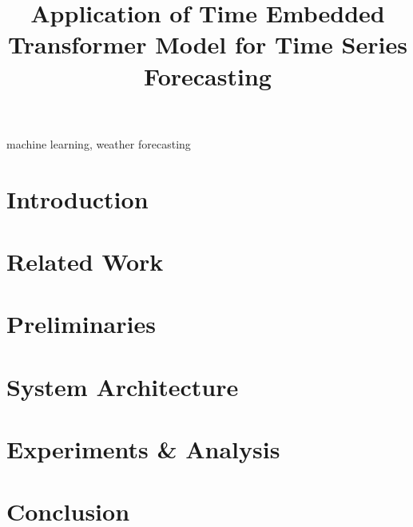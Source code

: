 





\newpage

\title{Application of Time Embedded Transformer Model for Time Series Forecasting}
\author{
    \and
    \and
    \and
}


\maketitle

\begin{abstract}

\end{abstract}

\begin{IEEEkeywords}
machine learning, weather forecasting
\end{IEEEkeywords}

\section{Introduction}


\section{Related Work}\label{sec:relatedwork}




\section{Preliminaries}


\section{System Architecture}\label{sec:system architecture} %










\section{Experiments \& Analysis}\label{sec:ExpRes}


\section{Conclusion}






%

